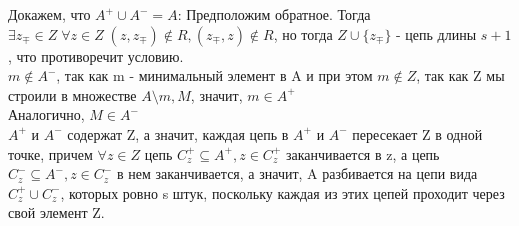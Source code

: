 Докажем, что  $A^+ \cup A^- = A$: Предположим обратное. Тогда $\exists z_{\mp} \in Z \; \forall z \in Z \; (z, z_{\mp}) \not\in R, (z_{\mp}, z) \not\in R$, но тогда $Z \cup \{z_{\mp}\}$ - цепь длины $s + 1$, что противоречит условию.\\
$m \not\in A^-$, так как m - минимальный элемент в A и при этом $m \not\in Z$, так как Z мы строили в множестве $A \setminus {m, M}$, значит, $m \in A^+$\\
Аналогично, $M \in A^-$\\
$A^+$ и $A^-$ содержат Z, а значит, каждая цепь в $A^+$ и $A^-$ пересекает Z в одной точке, причем $\forall z \in Z$ цепь $C^+_z \subseteq A^+, z \in C^+_z$ заканчивается в z, а цепь $C^-_z \subseteq A^-, z \in C^-_z$ в нем заканчивается, а значит, A разбивается на цепи вида $C^+_z \cup C^-_z$, которых ровно s штук, поскольку каждая из этих цепей проходит через свой элемент Z.
